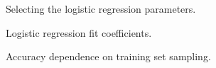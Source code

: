 \documentclass{article}
\begin{document}
\begin{figure}[h]
  \centering
  \caption{Selecting the logistic regression parameters.}
\end{figure}

\begin{figure}[h]
  \centering
  \caption{Logistic regression fit coefficients.}
\end{figure}

\begin{figure}[h]
  \centering
  \caption{Accuracy dependence on training set sampling. }
\end{figure}
\end{document}
